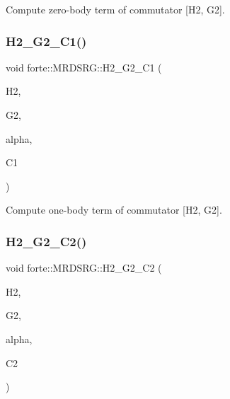 Compute zero-\/body term of commutator \mbox{[}H2, G2\mbox{]}. 

\mbox{\label{classforte_1_1_m_r_d_s_r_g_a92cceb7d9036f37b7013cafce0b27179}} 
\subsubsection{\texorpdfstring{H2\+\_\+\+G2\+\_\+\+C1()}{H2\_G2\_C1()}}
{\footnotesize\ttfamily void forte\+::\+M\+R\+D\+S\+R\+G\+::\+H2\+\_\+\+G2\+\_\+\+C1 (\begin{DoxyParamCaption}\item[{Blocked\+Tensor \&}]{H2,  }\item[{Blocked\+Tensor \&}]{G2,  }\item[{const double \&}]{alpha,  }\item[{Blocked\+Tensor \&}]{C1 }\end{DoxyParamCaption})\hspace{0.3cm}{\ttfamily [protected]}}



Compute one-\/body term of commutator \mbox{[}H2, G2\mbox{]}. 

\mbox{\label{classforte_1_1_m_r_d_s_r_g_ae64c5b40a006c4faf9a11010d0b1c6c0}} 
\subsubsection{\texorpdfstring{H2\+\_\+\+G2\+\_\+\+C2()}{H2\_G2\_C2()}}
{\footnotesize\ttfamily void forte\+::\+M\+R\+D\+S\+R\+G\+::\+H2\+\_\+\+G2\+\_\+\+C2 (\begin{DoxyParamCaption}\item[{Blocked\+Tensor \&}]{H2,  }\item[{Blocked\+Tensor \&}]{G2,  }\item[{const double \&}]{alpha,  }\item[{Blocked\+Tensor \&}]{C2 }\end{DoxyParamCaption})\hspace{0.3cm}{\ttfamily [protected]}}




